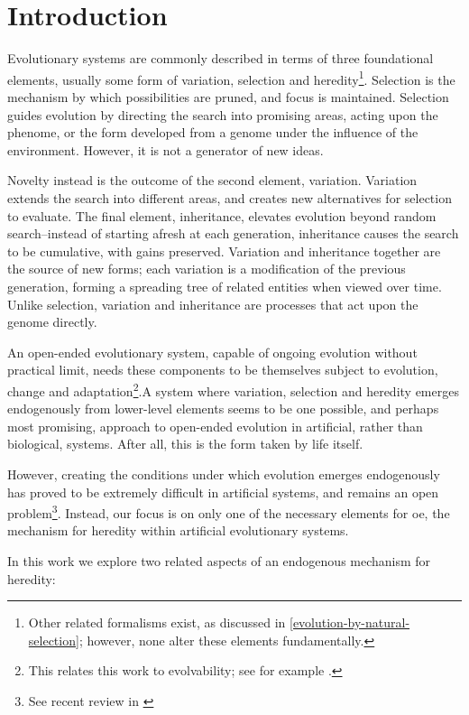 \chapter{Introduction}

Evolutionary systems are commonly described in terms of three foundational elements, usually some form of variation, selection and heredity\footnote{Other related formalisms exist, as discussed in  \cref{evolution-by-natural-selection}; however, none alter these elements fundamentally.}. Selection is the mechanism by which possibilities are pruned, and focus is maintained. Selection guides evolution by directing the search into promising areas, acting upon the phenome, or the form developed from a genome under the influence of the environment. However, it is not a generator of new ideas. 

Novelty instead is the outcome of the second element, variation. Variation extends the search into different areas, and creates new alternatives for selection to evaluate. The final element, inheritance, elevates evolution beyond random search--instead of starting afresh at each generation, inheritance causes the search to be cumulative, with gains preserved. Variation and inheritance together are the source of new forms; each variation is a modification of the previous generation, forming a spreading tree of related entities when viewed over time. Unlike selection, variation and inheritance are processes that act upon the genome directly.

An open-ended evolutionary system, capable of ongoing evolution without practical limit, needs these components to be themselves subject to evolution, change and adaptation\footnote{This relates this work to evolvability; see for example \textcite{Pigliucci2008,Wagner:1996kc,Wagner:2008mi}.}.A system where variation, selection and heredity emerges endogenously from lower-level elements seems to be one possible, and perhaps most promising, approach to open-ended evolution in artificial, rather than biological, systems. After all, this is the form taken by life itself.

However, creating the conditions under which evolution emerges endogenously has proved to be extremely difficult in artificial systems, and remains an open problem\footnote{See recent review in \cite{BanzhafBaumgaertnerBeslonEtAl2016}}. Instead, our focus is on only one of the necessary elements for \gls{oe}, the mechanism for heredity within artificial evolutionary systems.

In this work we explore two related aspects of an endogenous mechanism for heredity:

